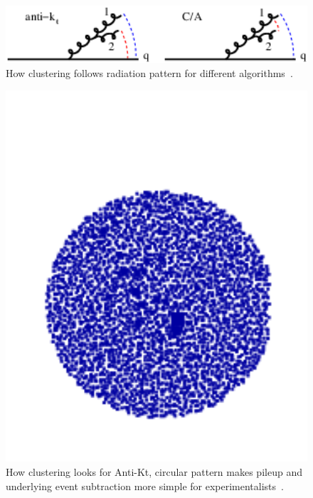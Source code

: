 \begin{figure}[htb]
\centering
\includegraphics[width=1.0\textwidth]{visuals/config-antikt-double-lund.png}
\caption{How clustering follows radiation pattern for different algorithms~\cite{Dreyer:2018nbf}.}
\label{fig:lund}
\end{figure}

\begin{figure}[htb]
\centering
\includegraphics[width=1.0\textwidth]{visuals/figs_subjet-plots-antikt.png}
\caption{How clustering looks for Anti-Kt, circular pattern makes pileup and underlying event subtraction more simple for experimentalists~\cite{Dreyer:2018nbf}.}
\label{fig:lund}
\end{figure}

